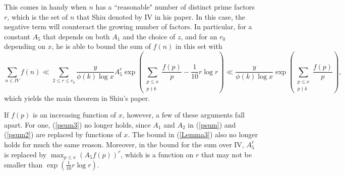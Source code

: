 \documentclass{amsart}
\begin{document}
This comes in handy when $n$ has a ``reasonable" number of distinct prime factors $r$, which is the set of $n$ that Shiu denoted by IV in his paper.  In this case, the negative term will counteract the growing number of factors.  In particular, for a constant $A_5$ that depends on both $A_1$ and the choice of $z$, and for an $r_0$ depending on $x$, he is able to bound the sum of $f(n)$ in this set with
$$\sum_{n\in IV}f(n)\ll \sum_{2\leq r\leq r_0}\frac{y}{\phi(k)\log x}A_5^r\exp\left(\sum_{\substack{p\leq x \\ p\nmid k}}\frac{f(p)}{p}-\frac{1}{10}r\log r\right)\ll \frac{y}{\phi(k)\log x}\exp\left(\sum_{\substack{p\leq x \\ p\nmid k}}\frac{f(p)}{p}\right),$$
which yields the main theorem in Shiu's paper.

If $f(p)$ is an increasing function of $x$, however, a few of these arguments fall apart.  For one, (\ref{psum3}) no longer holds, since $A_1$ and $A_2$ in (\ref{psum}) and (\ref{psum2}) are replaced by functions of $x$.  The bound in (\ref{Lemma3}) also no longer holds for much the same reason.  Moreover, in the bound for the sum over IV, $A_5^r$ is replaced by $\max_{p\leq x}\left(A_5 f(p)\right)^r$, which is a function on $r$ that may not be smaller than $\exp\left(\frac{1}{10}r\log r\right)$.  
\end{document}
